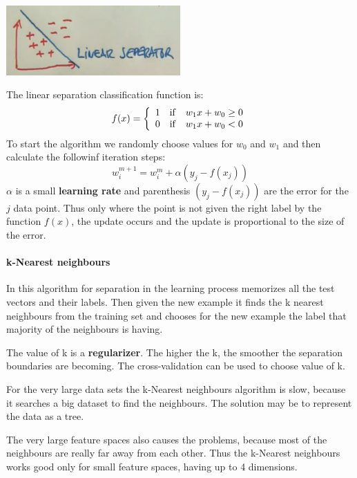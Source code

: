 \documentclass[a4paper,10pt]{article}
\begin{document}
\begin{center}
\includegraphics[width=0.5\textwidth]{PerceptionAlgorithm.png}
\end{center}

The linear separation classification function is:
\[
  f(x) = \left\{ 
  \begin{array}{l l l}
    1 & \mathrm{if} & w_1 x + w_0 \geq 0\\
    0 & \mathrm{if} & w_1 x + w_0 < 0\\
  \end{array} \right.
\]
To start the algorithm we randomly choose values for $w_0$ and $w_1$ and then calculate the followinf iteration steps:
\[ w_i^{m+1} = w_i^m + \alpha (y_j - f(x_j) ) \]
$\alpha$ is a small \textbf{learning rate} and parenthesis $(y_j - f(x_j))$ are the error for the $j$ data point. Thus only where the point is not given the right label by the function $f(x)$, the update occurs and the update is proportional to the size of the error.

\paragraph{k-Nearest neighbours}

In this algorithm for separation in the learning process memorizes all the test vectors and their labels. Then given the new example it finds the k nearest neighbours from the training set and chooses for the new example the label that majority of the neighbours is having.

The value of k is a \textbf{regularizer}. The higher the k, the smoother the separation boundaries are becoming. The cross-validation can be used to choose value of k.

For the very large data sets the k-Nearest neighbours algorithm is slow, because it searches a big dataset to find the neighbours. The solution may be to represent the data as a tree.

The very large feature spaces also causes the problems, because most of the neighbours are really far away from each other. Thus the k-Nearest neighbours works good only for small feature spaces, having up to 4 dimensions.
\end{document}
